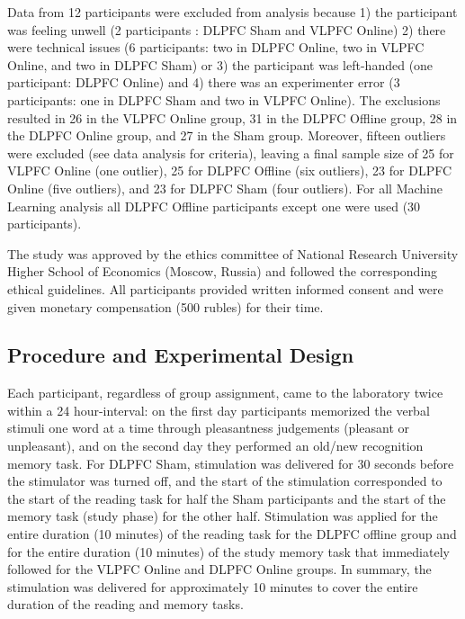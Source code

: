 \documentclass[10pt,letterpaper]{article}
\begin{document}
Data from 12 participants were excluded from analysis because 1) the participant was feeling unwell (2 participants : DLPFC Sham and VLPFC Online) 2) there were technical issues (6 participants: two in DLPFC Online, two in VLPFC Online, and two in DLPFC Sham) or 3) the participant was left-handed (one participant: DLPFC Online) and 4) there was an experimenter error (3 participants: one in DLPFC Sham and two in VLPFC Online). The exclusions resulted in 26 in the VLPFC Online group, 31 in the DLPFC Offline group, 28 in the DLPFC Online group, and 27 in the Sham group. Moreover, fifteen outliers were excluded (see data analysis for criteria), leaving a final sample size of 25 for VLPFC Online (one outlier), 25 for DLPFC Offline (six outliers), 23 for DLPFC Online (five outliers), and 23 for DLPFC Sham (four outliers). For all Machine Learning analysis all DLPFC Offline participants except one were used (30 participants).

The study was approved by the ethics committee of National Research University Higher School of Economics (Moscow, Russia) and followed the corresponding ethical guidelines. All participants provided written informed consent and were given monetary compensation (500 rubles) for their time. 

\subsection{Procedure and Experimental Design}
Each participant, regardless of group assignment, came to the laboratory twice within a 24 hour-interval: on the first day participants memorized the verbal stimuli one word at a time through pleasantness judgements (pleasant or unpleasant), and on the second day they performed an old/new recognition memory task. For DLPFC Sham, stimulation was delivered for 30 seconds before the stimulator was turned off, and the start of the stimulation corresponded to the start of the reading task for half the Sham participants and the start of the memory task (study phase) for the other half. Stimulation was applied for the entire duration (10 minutes) of the reading task for the DLPFC offline group and for the entire duration (10 minutes) of the study memory task that immediately followed for the VLPFC Online and DLPFC Online groups. In summary, the stimulation was delivered for approximately 10 minutes to cover the entire duration of the reading and memory tasks.
\end{document}
